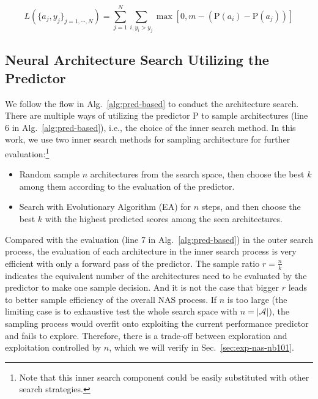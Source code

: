 \documentclass[runningheads]{llncs}
\begin{document}
\begin{equation}
  L(\{a_j, y_j\}_{j=1,\cdots,N}) = \sum_{j=1}^N\sum_{i, y_i > y_j} \max[0, m - (\mbox{P}(a_i) - \mbox{P}(a_j))]
\end{equation}


\subsection{Neural Architecture Search Utilizing the Predictor}
\label{sec:method-nas}


We follow the flow in Alg.~\ref{alg:pred-based} to conduct the architecture search. There are multiple ways of utilizing the predictor $\mbox{P}$ to sample architectures (line 6 in Alg.~\ref{alg:pred-based}), i.e., the choice of the inner search method. In this work, we use two inner search methods for sampling architecture for further evaluation:\footnote{Note that this inner search component could be easily substituted with other search strategies.}
\begin{itemize}
    \item Random sample $n$ architectures from the search space, then choose the best $k$ among them according to the evaluation of the predictor.

    \item Search with Evolutionary Algorithm (EA) for $n$ steps, and then choose the best $k$ with the highest predicted scores among the seen architectures.

\end{itemize}


Compared with the evaluation (line 7 in Alg.~\ref{alg:pred-based}) in the outer search process, the evaluation of each architecture in the inner search process is very efficient with only a forward pass of the predictor.
The sample ratio $r=\frac{n}{k}$ indicates the equivalent number of the architectures need to be evaluated by the predictor to make one sample decision. And it is not the case that bigger $r$ leads to better sample efficiency of the overall NAS process. If $n$ is too large (the limiting case is to exhaustive test the whole search space with $n=|\mathcal{A}|$), the sampling process would overfit onto exploiting the current performance predictor and fails to explore. Therefore, there is a trade-off between exploration and exploitation controlled by $n$, which we will verify in Sec.~\ref{sec:exp-nas-nb101}.
\end{document}
